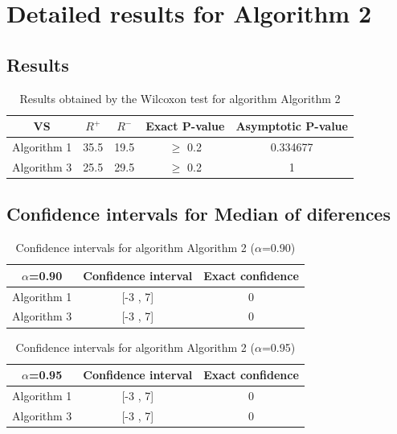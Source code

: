 \documentclass[a4paper,10pt]{article}
\begin{document}
 \clearpage 


\section{Detailed results for Algorithm 2}


\subsection{Results}

\begin{table}[!htp]
\centering\small
\begin{tabular}{
|c|c|c|c|c|}
\hline
 VS & $R^{+}$ & $R^{-}$ & Exact P-value & Asymptotic P-value \\ \hline 
Algorithm 1 & 35.5 & 19.5 & $\geq$ 0.2 & 0.334677\\ \hline 
Algorithm 3 & 25.5 & 29.5 & $\geq$ 0.2 & 1\\ \hline 

\end{tabular}
\caption{Results obtained by the Wilcoxon test for algorithm Algorithm 2}
\end{table}

\subsection{Confidence intervals for Median of diferences}

\begin{table}[!htp]
\centering\small
\begin{tabular}{
|c|c|c|}
\hline
 $\alpha$=0.90 & Confidence interval & Exact confidence \\ \hline 
Algorithm 1 & [-3 , 7] & 0\\ \hline 
Algorithm 3 & [-3 , 7] & 0\\ \hline 

\end{tabular}
\caption{Confidence intervals for algorithm Algorithm 2 ($\alpha$=0.90)}
\end{table}
\begin{table}[!htp]
\centering\small
\begin{tabular}{
|c|c|c|}
\hline
 $\alpha$=0.95 & Confidence interval & Exact confidence \\ \hline 
Algorithm 1 & [-3 , 7] & 0\\ \hline 
Algorithm 3 & [-3 , 7] & 0\\ \hline 

\end{tabular}
\caption{Confidence intervals for algorithm Algorithm 2 ($\alpha$=0.95)}
\end{table}
\end{document}

